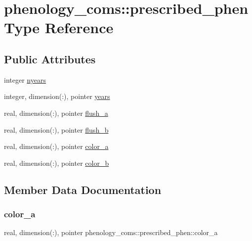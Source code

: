 \hypertarget{structphenology__coms_1_1prescribed__phen}{}\section{phenology\+\_\+coms\+:\+:prescribed\+\_\+phen Type Reference}
\label{structphenology__coms_1_1prescribed__phen}
\subsection*{Public Attributes}
\begin{DoxyCompactItemize}
\item 
integer \hyperlink{structphenology__coms_1_1prescribed__phen_ae504780a4760ecefc6851a141bbb426b}{nyears}
\item 
integer, dimension(\+:), pointer \hyperlink{structphenology__coms_1_1prescribed__phen_ae40ae2762a61f5e09ce4162444b253b0}{years}
\item 
real, dimension(\+:), pointer \hyperlink{structphenology__coms_1_1prescribed__phen_a04026ef978e9fb2e2a602d3fb25a1b81}{flush\+\_\+a}
\item 
real, dimension(\+:), pointer \hyperlink{structphenology__coms_1_1prescribed__phen_a75c4a5b801c5e6d00dd23e7c0de13113}{flush\+\_\+b}
\item 
real, dimension(\+:), pointer \hyperlink{structphenology__coms_1_1prescribed__phen_ad1c3cc319ade0cc196131f3c1e94e64e}{color\+\_\+a}
\item 
real, dimension(\+:), pointer \hyperlink{structphenology__coms_1_1prescribed__phen_a1e62e38b18938bd089d8ac27b3d3eec0}{color\+\_\+b}
\end{DoxyCompactItemize}


\subsection{Member Data Documentation}
\mbox{\label{structphenology__coms_1_1prescribed__phen_ad1c3cc319ade0cc196131f3c1e94e64e}} 
\subsubsection{\texorpdfstring{color\+\_\+a}{color\_a}}
{\footnotesize\ttfamily real, dimension(\+:), pointer phenology\+\_\+coms\+::prescribed\+\_\+phen\+::color\+\_\+a}

